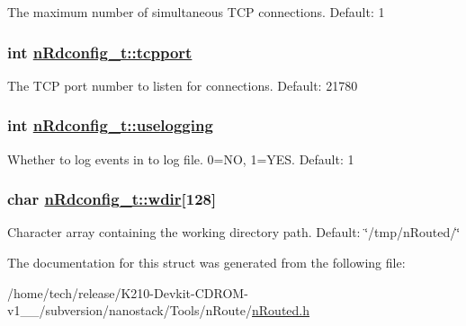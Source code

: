 The maximum number of simultaneous TCP connections. Default: 1 \hypertarget{structnRdconfig__t_38a3366fe88f4f983001879c3d21532b}{
\subsubsection[tcpport]{\setlength{\rightskip}{0pt plus 5cm}int \hyperlink{structnRdconfig__t_38a3366fe88f4f983001879c3d21532b}{n\-Rdconfig\_\-t::tcpport}}}
\label{structnRdconfig__t_38a3366fe88f4f983001879c3d21532b}


The TCP port number to listen for connections. Default: 21780 \hypertarget{structnRdconfig__t_1ea3e47a7eb26c77e75e086d43accfb5}{
\subsubsection[uselogging]{\setlength{\rightskip}{0pt plus 5cm}int \hyperlink{structnRdconfig__t_1ea3e47a7eb26c77e75e086d43accfb5}{n\-Rdconfig\_\-t::uselogging}}}
\label{structnRdconfig__t_1ea3e47a7eb26c77e75e086d43accfb5}


Whether to log events in to log file. 0=NO, 1=YES. Default: 1 \hypertarget{structnRdconfig__t_a7672061ebda79d00c44848f9fdd92f1}{
\subsubsection[wdir]{\setlength{\rightskip}{0pt plus 5cm}char \hyperlink{structnRdconfig__t_a7672061ebda79d00c44848f9fdd92f1}{n\-Rdconfig\_\-t::wdir}\mbox{[}128\mbox{]}}}
\label{structnRdconfig__t_a7672061ebda79d00c44848f9fdd92f1}


Character array containing the working directory path. Default: \char`\"{}/tmp/n\-Routed/\char`\"{} 

The documentation for this struct was generated from the following file:\begin{CompactItemize}
\item 
/home/tech/release/K210-Devkit-CDROM-v1\_\_/subversion/nanostack/Tools/n\-Route/\hyperlink{nRouted_8h}{n\-Routed.h}\end{CompactItemize}
